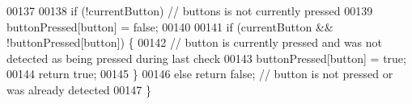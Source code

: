 \begin{DoxyCode}
00137 
00138     \textcolor{keywordflow}{if} (!currentButton) \textcolor{comment}{// buttons is not currently pressed}
00139         buttonPressed[button] = \textcolor{keyword}{false};
00140 
00141     \textcolor{keywordflow}{if} (currentButton && !buttonPressed[button]) \{
00142         \textcolor{comment}{// button is currently pressed and was not detected as being pressed during last check}
00143         buttonPressed[button] = \textcolor{keyword}{true};
00144         \textcolor{keywordflow}{return} \textcolor{keyword}{true};
00145     \}
00146     \textcolor{keywordflow}{else} \textcolor{keywordflow}{return} \textcolor{keyword}{false}; \textcolor{comment}{// button is not pressed or was already detected}
00147 \}
\end{DoxyCode}
